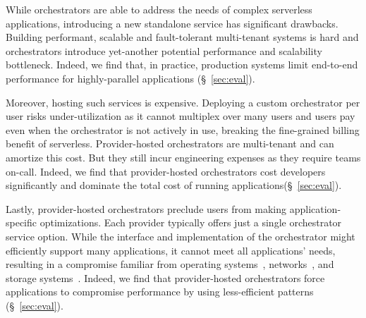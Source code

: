 While orchestrators are able to address the needs of complex serverless
applications, introducing a new standalone service has significant drawbacks.
Building performant, scalable and fault-tolerant multi-tenant systems is hard
and orchestrators introduce yet-another potential performance and scalability
bottleneck. Indeed, we find that, in practice, production systems limit
end-to-end performance for highly-parallel applications (\S~\ref{sec:eval}).

Moreover, hosting such services is expensive. Deploying a custom orchestrator
per user risks under-utilization as it cannot multiplex over many users and
users pay even when the orchestrator is not actively in use, breaking the
fine-grained billing benefit of serverless. Provider-hosted orchestrators are
multi-tenant and can amortize this cost. But they still incur engineering
expenses as they require teams on-call. Indeed, we find that provider-hosted
orchestrators cost developers significantly and dominate the total cost of
running applications(\S~\ref{sec:eval}).

Lastly, provider-hosted orchestrators preclude users from making
application-specific optimizations. Each provider typically offers just a
single orchestrator service option. While the interface and implementation of
the orchestrator might efficiently support many applications, it cannot meet
all applications' needs, resulting in a compromise familiar from operating
systems~\cite{exokernel,spin}, networks~\cite{active-networks,sdn}, and
storage systems~\cite{comet,splinter}. Indeed, we find that provider-hosted
orchestrators force applications to compromise performance by using
less-efficient patterns (\S~\ref{sec:eval}).